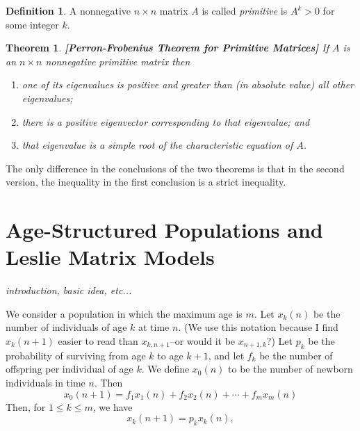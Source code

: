\documentclass[reqno]{immbook}
\numberwithin{equation}{chapter}
\newtheorem{theorem}{Theorem}
\numberwithin{question}{section}
\numberwithin{theorem}{chapter}
\numberwithin{figure}{chapter}
\theoremstyle{definition}
\newtheorem{definition}{Definition}[section]
\begin{document}
\begin{definition}
A nonnegative $n\times n$ matrix $A$ is called
\emph{primitive} is $A^k > 0$ for some integer $k$.
\end{definition}

\begin{theorem}
\textbf{[Perron-Frobenius Theorem for Primitive Matrices]}
If $A$ is an $n\times n$ nonnegative primitive matrix then
\begin{enumerate}
\item one of its eigenvalues is positive and greater than (in absolute value) all other eigenvalues;
\item there is a positive eigenvector corresponding to that eigenvalue; and
\item that eigenvalue is a simple root of the characteristic equation of $A$.
\end{enumerate}
\end{theorem}
The only difference in the conclusions of the two theorems
is that in the second version, the inequality in the first
conclusion is a strict inequality.

%
%
\section{Age-Structured Populations and Leslie Matrix Models}
\emph{introduction, basic idea, etc...}

We consider a population in which the maximum
age is $m$.
Let $x_{k}(n)$ be the number of individuals
of age $k$ at time $n$.
(We use this notation because
I find $x_{k}(n+1)$
easier to read than $x_{k,n+1}$--or would it be $x_{n+1,k}$?)
Let
$p_k$ be the probability of surviving from age $k$
to age $k+1$,
and let $f_k$ be the number of offspring per individual
of age $k$.
We define $x_0(n)$ to be the number of newborn individuals
in time $n$.
Then
\begin{equation}
  x_{0}(n+1) = f_1 x_{1}(n) + f_2 x_{2}(n) + \cdots + f_m x_{m}(n)
\label{eqn:leslie:newborn}
\end{equation}
Then, for $1 \le k \le m$, we have
\begin{equation}
   x_{k}(n+1) = p_k x_{k}(n),
\label{eqn:leslie:nextgen}
\end{equation}
\end{document}
